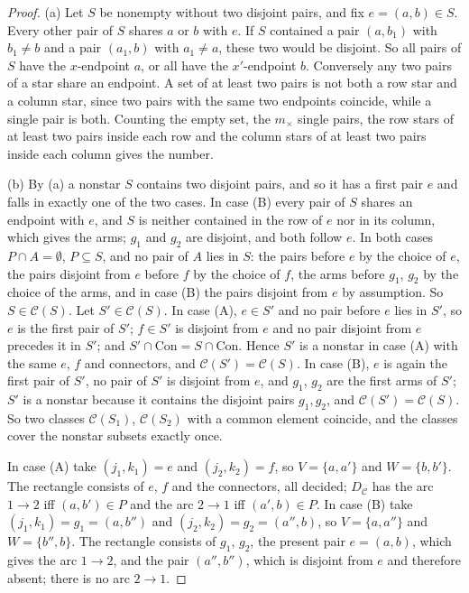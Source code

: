 \begin{proof}
(a) Let $S$ be nonempty without two disjoint pairs, and fix $e=(a,b)\in S$.
Every other pair of $S$ shares $a$ or $b$ with $e$. If $S$ contained a pair
$(a,b_1)$ with $b_1\ne b$ and a pair $(a_1,b)$ with $a_1\ne a$, these two would be
disjoint. So all pairs of $S$ have the $x$-endpoint $a$, or all have the
$x'$-endpoint $b$. Conversely any two pairs of a star share an endpoint. A set of
at least two pairs is not both a row star and a column star, since two pairs with
the same two endpoints coincide, while a single pair is both. Counting the empty
set, the $m_\times$ single pairs, the row stars of at least two pairs inside each row
and the column stars of at least two pairs inside each column gives the number.

(b) By (a) a nonstar $S$ contains two disjoint pairs, and so it has a first pair
$e$ and falls in exactly one of the two cases. In case (B) every pair of $S$
shares an endpoint with $e$, and $S$ is neither contained in the row of $e$ nor
in its column, which gives the arms; $g_1$ and $g_2$ are disjoint, and both
follow $e$. In both cases $P\cap A=\emptyset$, $P\subseteq S$, and no pair of $A$
lies in $S$: the pairs before $e$ by the choice of $e$, the pairs disjoint from
$e$ before $f$ by the choice of $f$, the arms before $g_1$, $g_2$ by the choice of
the arms, and in case (B) the pairs disjoint from $e$ by assumption. So
$S\in\mathcal C(S)$. Let $S'\in\mathcal C(S)$. In case (A), $e\in S'$ and no pair
before $e$ lies in $S'$, so $e$ is the first pair of $S'$; $f\in S'$ is disjoint
from $e$ and no pair disjoint from $e$ precedes it in $S'$; and
$S'\cap\mathrm{Con}=S\cap\mathrm{Con}$. Hence $S'$ is a nonstar in case (A) with the
same $e$, $f$ and connectors, and $\mathcal C(S')=\mathcal C(S)$. In case (B), $e$
is again the first pair of $S'$, no pair of $S'$ is disjoint from $e$, and $g_1$,
$g_2$ are the first arms of $S'$; $S'$ is a nonstar because it contains the
disjoint pairs $g_1,g_2$, and $\mathcal C(S')=\mathcal C(S)$. So two classes
$\mathcal C(S_1)$, $\mathcal C(S_2)$ with a common element coincide, and the
classes cover the nonstar subsets exactly once.

In case (A) take $(j_1,k_1)=e$ and $(j_2,k_2)=f$, so $V=\{a,a'\}$ and
$W=\{b,b'\}$. The rectangle consists of $e$, $f$ and the connectors, all decided;
$D_{\mathcal C}$ has the arc $1\to2$ iff $(a,b')\in P$ and the arc $2\to1$ iff
$(a',b)\in P$. In case (B) take $(j_1,k_1)=g_1=(a,b'')$ and $(j_2,k_2)=g_2=(a'',b)$,
so $V=\{a,a''\}$ and $W=\{b'',b\}$. The rectangle consists of $g_1$, $g_2$, the
present pair $e=(a,b)$, which gives the arc $1\to2$, and the pair $(a'',b'')$,
which is disjoint from $e$ and therefore absent; there is no arc $2\to1$.


\end{proof}
